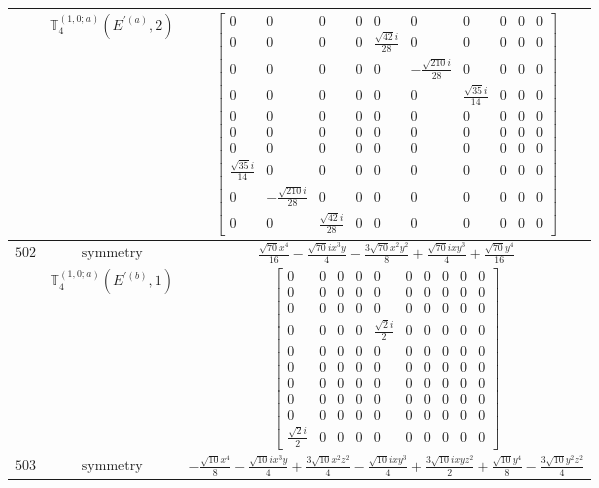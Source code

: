 \documentclass[fleqn,8pt,landscape]{jsarticle}
\begin{document}
\begin{longtable}{ccc}
$  $ & $ \mathbb{T}_{4}^{(1,0;a)}(E^{\prime(a)},2) $ & $ \begin{bmatrix} 0 & 0 & 0 & 0 & 0 & 0 & 0 & 0 & 0 & 0 \\ 0 & 0 & 0 & 0 & \frac{\sqrt{42} i}{28} & 0 & 0 & 0 & 0 & 0 \\ 0 & 0 & 0 & 0 & 0 & - \frac{\sqrt{210} i}{28} & 0 & 0 & 0 & 0 \\ 0 & 0 & 0 & 0 & 0 & 0 & \frac{\sqrt{35} i}{14} & 0 & 0 & 0 \\ 0 & 0 & 0 & 0 & 0 & 0 & 0 & 0 & 0 & 0 \\ 0 & 0 & 0 & 0 & 0 & 0 & 0 & 0 & 0 & 0 \\ 0 & 0 & 0 & 0 & 0 & 0 & 0 & 0 & 0 & 0 \\ \frac{\sqrt{35} i}{14} & 0 & 0 & 0 & 0 & 0 & 0 & 0 & 0 & 0 \\ 0 & - \frac{\sqrt{210} i}{28} & 0 & 0 & 0 & 0 & 0 & 0 & 0 & 0 \\ 0 & 0 & \frac{\sqrt{42} i}{28} & 0 & 0 & 0 & 0 & 0 & 0 & 0 \end{bmatrix} $ \\ \hline
$ 502 $ & $ \text{symmetry} $ & $ \frac{\sqrt{70} x^{4}}{16} - \frac{\sqrt{70} i x^{3} y}{4} - \frac{3 \sqrt{70} x^{2} y^{2}}{8} + \frac{\sqrt{70} i x y^{3}}{4} + \frac{\sqrt{70} y^{4}}{16} $ \\
$  $ & $ \mathbb{T}_{4}^{(1,0;a)}(E^{\prime(b)},1) $ & $ \begin{bmatrix} 0 & 0 & 0 & 0 & 0 & 0 & 0 & 0 & 0 & 0 \\ 0 & 0 & 0 & 0 & 0 & 0 & 0 & 0 & 0 & 0 \\ 0 & 0 & 0 & 0 & 0 & 0 & 0 & 0 & 0 & 0 \\ 0 & 0 & 0 & 0 & \frac{\sqrt{2} i}{2} & 0 & 0 & 0 & 0 & 0 \\ 0 & 0 & 0 & 0 & 0 & 0 & 0 & 0 & 0 & 0 \\ 0 & 0 & 0 & 0 & 0 & 0 & 0 & 0 & 0 & 0 \\ 0 & 0 & 0 & 0 & 0 & 0 & 0 & 0 & 0 & 0 \\ 0 & 0 & 0 & 0 & 0 & 0 & 0 & 0 & 0 & 0 \\ 0 & 0 & 0 & 0 & 0 & 0 & 0 & 0 & 0 & 0 \\ \frac{\sqrt{2} i}{2} & 0 & 0 & 0 & 0 & 0 & 0 & 0 & 0 & 0 \end{bmatrix} $ \\ \hline
$ 503 $ & $ \text{symmetry} $ & $ - \frac{\sqrt{10} x^{4}}{8} - \frac{\sqrt{10} i x^{3} y}{4} + \frac{3 \sqrt{10} x^{2} z^{2}}{4} - \frac{\sqrt{10} i x y^{3}}{4} + \frac{3 \sqrt{10} i x y z^{2}}{2} + \frac{\sqrt{10} y^{4}}{8} - \frac{3 \sqrt{10} y^{2} z^{2}}{4} $ \\

\end{longtable}
\end{document}
